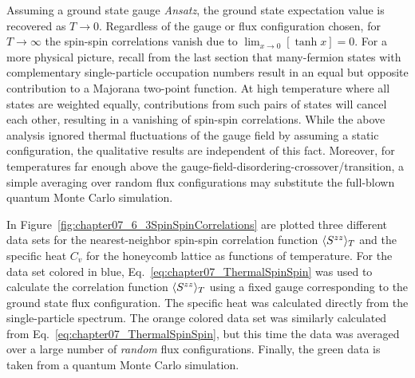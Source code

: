 Assuming a ground state gauge \textit{Ansatz}, the ground state expectation value is recovered as $T\rightarrow 0$.
Regardless of the gauge or flux configuration chosen, for $T\rightarrow \infty$ the spin-spin correlations vanish due to $\lim_{x\rightarrow 0} \left[\tanh{x}\right] = 0$.
For a more physical picture, recall from the last section that many-fermion states with complementary single-particle occupation numbers result in an equal but opposite contribution to a Majorana two-point function.
At high temperature where all states are weighted equally, contributions from such pairs of states will cancel each other, resulting in a vanishing of spin-spin correlations.
While the above analysis ignored thermal fluctuations of the gauge field by assuming a static configuration, the qualitative results are independent of this fact.
Moreover, for temperatures far enough above the gauge-field-disordering-crossover/transition, a simple averaging over random flux configurations may substitute the full-blown quantum Monte Carlo simulation.

In Figure~\ref{fig:chapter07_6_3SpinSpinCorrelations} are plotted three different data sets for the nearest-neighbor spin-spin correlation function $\langle S^{zz} \rangle_T$ and the specific heat $C_v$ for the honeycomb lattice as functions of temperature.
For the data set colored in blue, Eq.~\eqref{eq:chapter07_ThermalSpinSpin} was used to calculate the correlation function $\langle S^{zz} \rangle_T$ using a fixed gauge corresponding to the ground state flux configuration.
The specific heat was calculated directly from the single-particle spectrum.
The orange colored data set was similarly calculated from Eq.~\eqref{eq:chapter07_ThermalSpinSpin}, but this time the data was averaged over a large number of \textit{random} flux configurations.
Finally, the green data is taken from a quantum Monte Carlo simulation.


